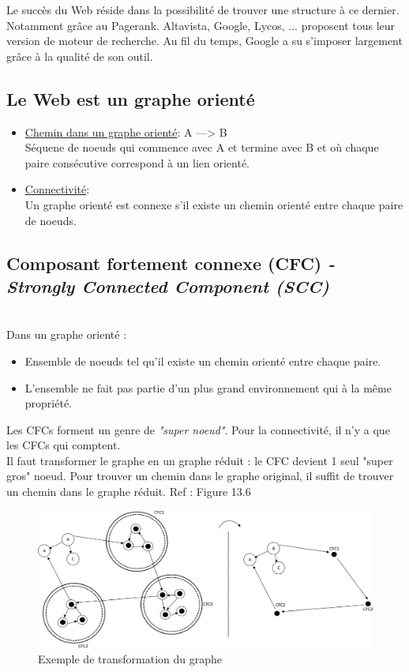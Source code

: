 \documentclass{article}
\begin{document}
Le succès du Web réside dans la possibilité de trouver une structure à ce dernier. Notamment grâce au Pagerank. Altavista, Google, Lycos, ... proposent tous leur version de moteur de recherche. Au fil du temps, Google a su s'imposer largement grâce à la qualité de son outil.

\subsection{Le Web est un graphe orienté}
\begin{itemize}
\item \underline{Chemin dans un graphe orienté}: A ---> B\\
Séquene de noeuds qui commence avec A et termine avec B et où chaque paire consécutive correspond à un lien orienté.

\item \underline{Connectivité}: \\
Un graphe orienté est connexe s'il existe un chemin orienté entre chaque paire de noeuds.
\end{itemize}

\subsection{Composant fortement connexe (CFC) \textit{- Strongly Connected Component (SCC)} }
\\
Dans un graphe orienté :
\begin{itemize}
    \item Ensemble de noeuds tel qu'il existe un chemin orienté entre                   chaque paire.
    \item L'ensemble ne fait pas partie d'un plus grand environnement qui               à la même propriété. 
\end{itemize}

Les CFCs forment un genre de \textit{"super noeud"}. Pour la connectivité, il n'y a que les CFCs qui comptent.
\\


Il faut transformer le graphe en un graphe réduit : le CFC devient 1 seul "super gros" noeud. Pour trouver un chemin dans le graphe original, il suffit de trouver un chemin dans le graphe réduit. Ref : Figure 13.6
\\

\begin{figure}[!h]
\centering
\includegraphics[width=500px]{images/23_schema2.png}
\caption{Exemple de transformation du graphe}
\label{fig:cfc}
\end{figure}
\end{document}
